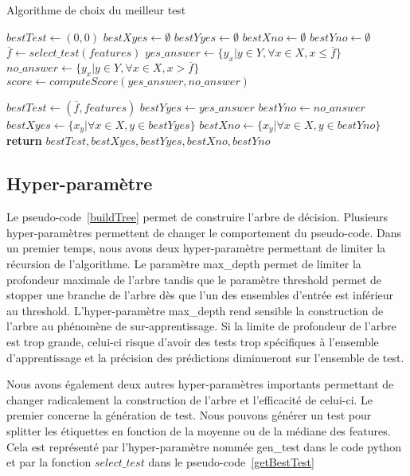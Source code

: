 \documentclass[french, 14pt]{memoir}
\begin{document}
\begin{algorithm}
\begin{minipage}[t]{20cm}
\caption{Algorithme de choix du meilleur test}
\label{getBestTest}
\begin{algorithmic}[1]
\State $bestTest \gets (0,0)$
\State $bestXyes \gets \emptyset$
\State $bestYyes \gets \emptyset$
\State $bestXno \gets \emptyset$
\State $bestYno \gets \emptyset$
\State $\overline{f} \gets select\_test(features)$
\State $yes\_answer \gets \{y_x |y \in Y, \forall x \in X, x \leq \overline{f} \}$
\State $no\_answer \gets \{y_x |y \in Y, \forall x \in X, x > \overline{f} \}$
\State $score \gets computeScore(yes\_answer, no\_answer)$

\State $bestTest \gets (\overline{f}, features)$
\State $bestYyes \gets yes\_answer$
\State $bestYno \gets no\_answer$
 \State $bestXyes \gets \{x_y |\forall x \in X, y \in bestYyes\}$
 \State $bestXno \gets \{x_y |\forall x \in X, y \in bestYno\}$
\EndIf
\EndFor
\State \textbf{return} $bestTest, bestXyes, bestYyes, bestXno, bestYno$
\EndFunction
\end{algorithmic}
\end{minipage}
\end{algorithm}


\subsection{Hyper-paramètre}

Le pseudo-code~\ref{buildTree} permet de construire l'arbre de décision. Plusieurs hyper-paramètres permettent de changer le comportement du pseudo-code. Dans un premier temps, nous avons deux hyper-paramètre permettant de limiter la récursion de l'algorithme. Le paramètre max\_depth permet de limiter la profondeur maximale de l'arbre tandis que le paramètre threshold permet de stopper une branche de l'arbre dès que l'un des ensembles d'entrée est inférieur au threshold. L'hyper-paramètre max\_depth rend sensible la construction de l'arbre au phénomène de sur-apprentissage. Si la limite de profondeur de l'arbre est trop grande, celui-ci risque d'avoir des tests trop spécifiques à l'ensemble d'apprentissage et la précision des prédictions diminueront sur l'ensemble de test.

Nous avons également deux autres hyper-paramètres importants permettant de changer radicalement la construction de l'arbre et l'efficacité de celui-ci. Le premier concerne la génération de test. Nous pouvons générer un test pour splitter les étiquettes en fonction de la moyenne ou de la médiane des features. Cela est représenté par l'hyper-paramètre nommée gen\_test dans le code python et par la fonction $select\_test$ dans le pseudo-code~\ref{getBestTest}
\end{document}
